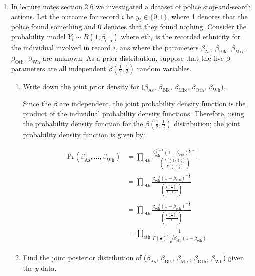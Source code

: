 \documentclass[10pt,\jkfside,a4paper]{article}
\begin{document}
\begin{enumerate}
\item In lecture notes section 2.6 we investigated a dataset of police
stop-and-search actions. Let the outcome for record $i$ be $y_i \in \{0,
1\}$, where 1 denotes that the police found something and 0 denotes that
they found nothing. Consider the probability model $Y_i\sim B(1,
\beta_{\text{eth}})$ where eth$_i$ is the recorded ethnicity for the
individual involved in record $i$, ans where the parameters
$\beta_{\text{As}}$, $\beta_{\text{Blk}}$, $\beta_{\text{Mix}}$,
$\beta_{\text{Oth}}$, $\beta_{\text{Wh}}$ are unknown. As a prior
distribution, suppose that the five $\beta$ parameters are all independent
$\beta\left(\frac{1}{2}, \frac{1}{2}\right)$ random variables.

\begin{enumerate}[label=(\alph*)]

\item Write down the joint prior density for ($\beta_{\text{As}}$, $\beta_{\text{Blk}}$, $\beta_{\text{Mix}}$,
$\beta_{\text{Oth}}$, $\beta_{\text{Wh}}$).

Since the $\beta$ are independent, the joint probability density function is
the product of the individual probability density functions. Therefore,
using the probability density function for the $\beta\left( \frac{1}{2},
\frac{1}{2}\right)$ distribution; the joint probability density function is
given by:

\[
\begin{split}
\text{Pr}(\beta_{\text{As}},\dots, \beta_{\text{Wh}})
&= \prod_{\text{eth}} \frac{\beta_{\text{eth}}^{\frac{1}{2} - 1}\left( 1 -
\beta_{\text{eth}}
\right)^{\frac{1}{2} - 1}}{\left( \frac{\Gamma\left(\frac{1}{2}\right)\Gamma\left( \frac{1}{2} \right)}{\Gamma\left( \frac{1}{2} + \frac{1}{2} \right)
}\right)} \\
&= \prod_{\text{eth}} \frac{\beta_{\text{eth}}^{-\frac{1}{2}}\left( 1 -
\beta_{\text{eth}}
\right)^{-\frac{1}{2}}}{\left( \frac{\Gamma\left(\frac{1}{2}\right)^2}{\Gamma\left( 1 \right)
}\right)} \\
&= \prod_{\text{eth}} \frac{\beta_{\text{eth}}^{-\frac{1}{2}}\left( 1 -
\beta_{\text{eth}}
\right)^{-\frac{1}{2}}}{\left( \frac{\Gamma\left(\frac{1}{2}\right)
^2}{1}\right)} \\
&= \prod_{\text{eth}}\frac{1}{\Gamma\left( \frac{1}{2} \right)^2\sqrt 
{\beta_\text{eth}(1 - \beta_\text{eth})}}
\end{split}
\]

\item Find the joint posterior distribution of ($\beta_{\text{As}}$, $\beta_{\text{Blk}}$, $\beta_{\text{Mix}}$,
$\beta_{\text{Oth}}$, $\beta_{\text{Wh}}$) given the $y$ data.


\end{enumerate}
\end{enumerate}
\end{document}

